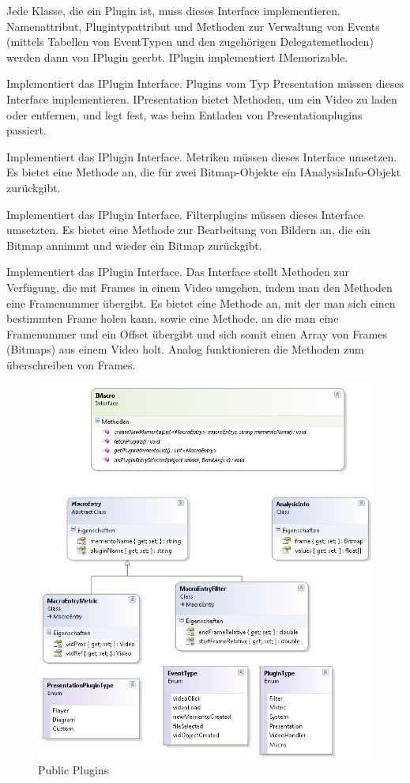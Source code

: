 Jede Klasse, die ein Plugin ist, muss dieses Interface implementieren. Namenattribut, Plugintypattribut und Methoden zur Verwaltung von Events (mittels Tabellen von EventTypen und den zugehörigen Delegatemethoden) werden dann von IPlugin geerbt. IPlugin implementiert IMemorizable.


Implementiert das IPlugin Interface. Plugins vom Typ Presentation müssen dieses Interface implementieren. IPresentation bietet Methoden, um ein Video zu laden oder entfernen, und legt fest, was beim Entladen von Presentationplugins passiert.


Implementiert das IPlugin Interface. Metriken müssen dieses Interface umsetzen. Es bietet eine Methode an, die für zwei Bitmap-Objekte ein IAnalysisInfo-Objekt zurückgibt.


Implementiert das IPlugin Interface. Filterplugins müssen dieses Interface umsetzten. Es bietet eine Methode zur Bearbeitung von Bildern an, die ein Bitmap annimmt und wieder ein Bitmap zurückgibt.


Implementiert das IPlugin Interface. Das Interface stellt Methoden zur Verfügung, die mit Frames in einem Video umgehen, indem man den Methoden eine Framenummer übergibt. Es bietet eine Methode an, mit der man sich einen bestimmten Frame holen kann, sowie eine Methode, an die man eine Framenummer und ein Offset übergibt und sich somit einen Array von Frames (Bitmaps) aus einem Video holt. Analog funktionieren die Methoden zum überschreiben von Frames.

\begin{figure}[H]
\noindent\includegraphics[width=\linewidth,height=\textheight,
keepaspectratio]{bilder/Klassendiagramm/PluginInterfaces2.png}
\caption{Public Plugins}
\end{figure}

